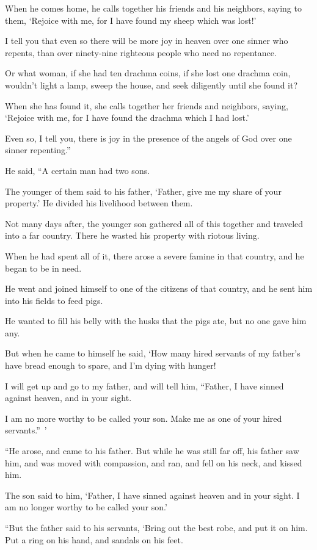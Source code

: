 When he comes home, he calls together his friends and his neighbors, saying to them, ‘Rejoice with me, for I have found my sheep which was lost!’

I tell you that even so there will be more joy in heaven over one sinner who repents, than over ninety-nine righteous people who need no repentance.

Or what woman, if she had ten drachma coins, if she lost one drachma coin, wouldn’t light a lamp, sweep the house, and seek diligently until she found it?

When she has found it, she calls together her friends and neighbors, saying, ‘Rejoice with me, for I have found the drachma which I had lost.’

Even so, I tell you, there is joy in the presence of the angels of God over one sinner repenting.”

He said, “A certain man had two sons.

The younger of them said to his father, ‘Father, give me my share of your property.’ He divided his livelihood between them.

Not many days after, the younger son gathered all of this together and traveled into a far country. There he wasted his property with riotous living.

When he had spent all of it, there arose a severe famine in that country, and he began to be in need.

He went and joined himself to one of the citizens of that country, and he sent him into his fields to feed pigs.

He wanted to fill his belly with the husks that the pigs ate, but no one gave him any.

But when he came to himself he said, ‘How many hired servants of my father’s have bread enough to spare, and I’m dying with hunger!

I will get up and go to my father, and will tell him, “Father, I have sinned against heaven, and in your sight.

I am no more worthy to be called your son. Make me as one of your hired servants.” ’

“He arose, and came to his father. But while he was still far off, his father saw him, and was moved with compassion, and ran, and fell on his neck, and kissed him.

The son said to him, ‘Father, I have sinned against heaven and in your sight. I am no longer worthy to be called your son.’

“But the father said to his servants, ‘Bring out the best robe, and put it on him. Put a ring on his hand, and sandals on his feet.

